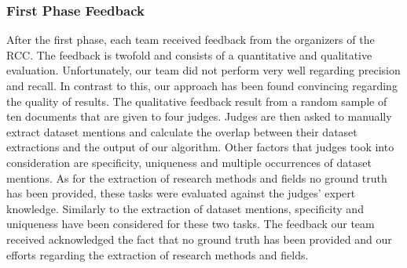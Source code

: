 \subsubsection{First Phase Feedback}
After the first phase, each team received feedback from the organizers of the RCC.
The feedback is twofold and consists of a quantitative and qualitative evaluation. Unfortunately, our team did not perform very well regarding precision and recall. In contrast to this, our approach has been found convincing regarding the quality of results. The qualitative feedback result from a random sample of ten documents that are given to four judges.
Judges are then asked to manually extract dataset mentions and calculate the overlap between their dataset extractions and the output of our algorithm.
Other factors that judges took into consideration are specificity, uniqueness and multiple occurrences of dataset mentions.
As for the extraction of research methods and fields no ground truth has been provided, these tasks were evaluated against the judges' expert knowledge.
Similarly to the extraction of dataset mentions, specificity and uniqueness have been considered for these two tasks.
The feedback our team received acknowledged the fact that no ground truth has been provided and our efforts regarding the extraction of research methods and fields.
